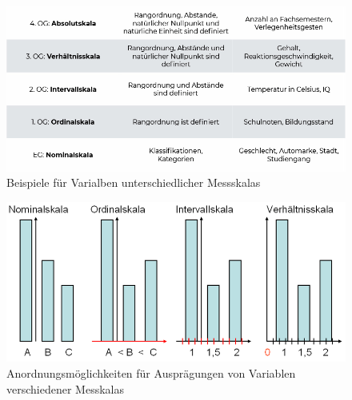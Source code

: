 \begin{figure}[H]
	\centering
	\includegraphics[scale = 0.4]{attachment/chapter_4/Scc023}
	\caption{Beispiele für Varialben unterschiedlicher Messskalas}
\end{figure}

\begin{figure}[H]
	\centering
	\includegraphics[scale = 0.37]{attachment/chapter_4/Scc024}
	\caption{Anordnungsmöglichkeiten für Ausprägungen von Variablen verschiedener Messkalas}
\end{figure}



